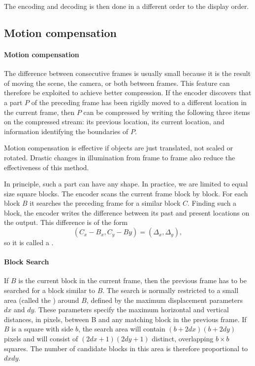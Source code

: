 \documentclass[a4paper, 11pt, openany]{book}
\begin{document}
The encoding and decoding is then done in a different order to the display order.

\subsection{Motion compensation}

\paragraph{Motion compensation}
The difference between consecutive frames is usually small because it is the result of moving the scene, the camera, or both between frames. This feature can therefore be exploited to achieve better compression. If the encoder discovers that a part $P$ of the preceding frame has been rigidly moved to a different location in the current frame, then $P$ can be compressed
by writing the following three items on the compressed stream: its previous location,
its current location, and information identifying the boundaries of $P$.

Motion compensation is effective if objects are just translated, not scaled or rotated.
Drastic changes in illumination from frame to frame also reduce the effectiveness of this
method.

In principle, such a part can have any shape. In practice, we are limited to equal size square
blocks. The encoder scans the current frame block by block. For each block $B$ it searches the preceding frame for a similar block $C$. Finding such a block, the encoder writes the difference between its past and present locations on the output. This difference is of the form
\[
    (C_x - B_x, C_y - By) = ( \Delta_x, \Delta_y),
\]
so it is called a .

\paragraph{Block Search}
If $B$ is the current block in the current frame, then the previous frame has to be
searched for a block similar to $B$. The search is normally restricted to
a small area (called the ) around $B$, defined by the maximum displacement parameters $dx$ and $dy$. These parameters specify the maximum horizontal and vertical distances, in pixels, between B and any matching block in the previous frame. If $B$ is a square with side $b$, the search area will contain $(b + 2dx)(b + 2dy)$ pixels and will consist of $(2dx+1)(2dy +1)$ distinct, overlapping $b \times b$ squares. The number of
candidate blocks in this area is therefore proportional to $dxdy$.
\end{document}
